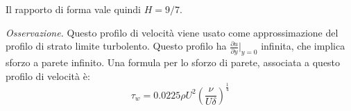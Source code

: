 Il rapporto di forma vale quindi $H = 9/7 $.

\vspace{0.5cm}
\textit{Osservazione.} Questo profilo di velocità viene usato come approssimazione del profilo
di strato limite turbolento. Questo profilo ha $\frac{\partial u}{\partial y}\big|_{y=0}$ infinita, che 
implica sforzo a parete infinito. 
Una formula per lo sforzo di parete, associata a questo profilo di velocità è:
\begin{equation}
  \tau_w = 0.0225 \rho U^2 \displaystyle \left( \frac{\nu}{U \delta} \right) ^ {\frac{1}{4}}
\end{equation}


